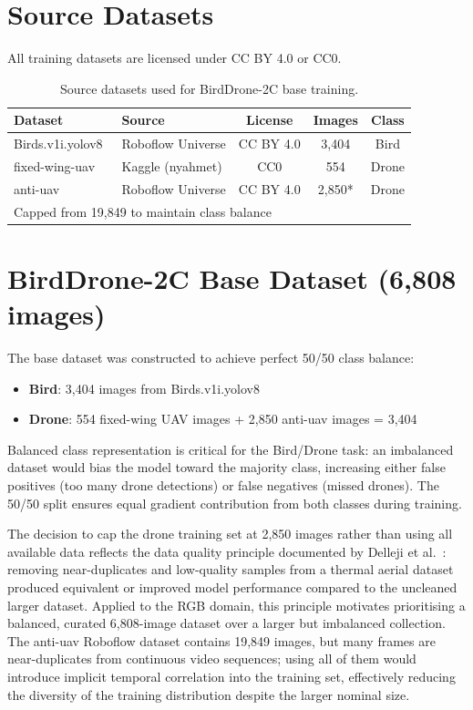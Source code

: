 \documentclass[12pt,a4paper]{report}
\begin{document}
\section{Source Datasets}

All training datasets are licensed under CC BY 4.0 or CC0.

\begin{table}[H]
\centering
\caption{Source datasets used for BirdDrone-2C base training.}
\label{tab:sources}
\begin{tabular}{|l|l|c|c|c|}
\hline
\textbf{Dataset} & \textbf{Source} & \textbf{License} & \textbf{Images} & \textbf{Class} \\
\hline
Birds.v1i.yolov8~\cite{birds_roboflow}   & Roboflow Universe & CC BY 4.0 & 3,404 & Bird \\
\hline
fixed-wing-uav~\cite{fixedwing_kaggle}   & Kaggle (nyahmet)  & CC0       & 554   & Drone \\
\hline
anti-uav~\cite{antiuav_roboflow}         & Roboflow Universe & CC BY 4.0 & 2,850* & Drone \\
\hline
\multicolumn{5}{l}{\small *Capped from 19,849 to maintain class balance}
\end{tabular}
\end{table}

\section{BirdDrone-2C Base Dataset (6,808 images)}

The base dataset was constructed to achieve perfect 50/50 class balance:
\begin{itemize}
  \item \textbf{Bird}: 3,404 images from Birds.v1i.yolov8
  \item \textbf{Drone}: 554 fixed-wing UAV images + 2,850 anti-uav images = 3,404
\end{itemize}

Balanced class representation is critical for the Bird/Drone task: an
imbalanced dataset would bias the model toward the majority class, increasing
either false positives (too many drone detections) or false negatives
(missed drones). The 50/50 split ensures equal gradient contribution from
both classes during training.

The decision to cap the drone training set at 2,850 images rather than
using all available data reflects the data quality principle documented
by Delleji et al.~\cite{delleji2025thermal}: removing near-duplicates
and low-quality samples from a thermal aerial dataset produced equivalent
or improved model performance compared to the uncleaned larger dataset.
Applied to the RGB domain, this principle motivates prioritising a
balanced, curated 6,808-image dataset over a larger but imbalanced
collection. The anti-uav Roboflow dataset contains 19,849 images, but
many frames are near-duplicates from continuous video sequences; using
all of them would introduce implicit temporal correlation into the
training set, effectively reducing the diversity of the training
distribution despite the larger nominal size.
\end{document}
